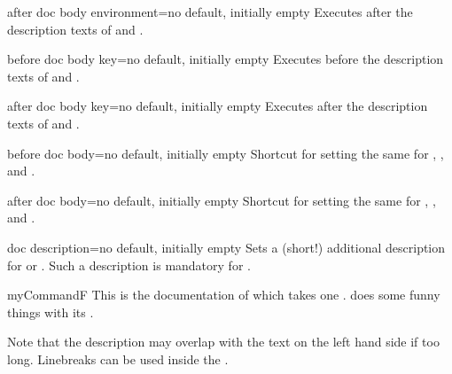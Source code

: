 \begin{docTcbKey}[][doc new=2015-10-09]{after doc body environment}{=}{no default, initially empty}
  Executes  after the description texts
  of  and .
\end{docTcbKey}


\begin{docTcbKey}[][doc new=2015-10-09]{before doc body key}{=}{no default, initially empty}
  Executes  before the description texts
  of  and .
\end{docTcbKey}

\begin{docTcbKey}[][doc new=2015-10-09]{after doc body key}{=}{no default, initially empty}
  Executes  after the description texts
  of  and .
\end{docTcbKey}

\begin{docTcbKey}[][doc new=2015-10-09]{before doc body}{=}{no default, initially empty}
  Shortcut for setting the same  for
  , ,
  and .
\end{docTcbKey}

\begin{docTcbKey}[][doc new=2015-10-09]{after doc body}{=}{no default, initially empty}
  Shortcut for setting the same  for
  , ,
  and .
\end{docTcbKey}


\clearpage
\begin{docTcbKey}{doc description}{=}{no default, initially empty}
  Sets a (short!) additional description  for
   or . Such a description is
  mandatory for .
\begin{dispExample}
\begin{docCommand*}[doc description=my description]{myCommandF}{}
  This is the documentation of  which takes one .
   does some funny things with its .
\end{docCommand*}
\end{dispExample}
\begin{marker}
Note that the description  may overlap with the text on the left
hand side if too long. Linebreaks can be used inside the .
\end{marker}
\end{docTcbKey}

